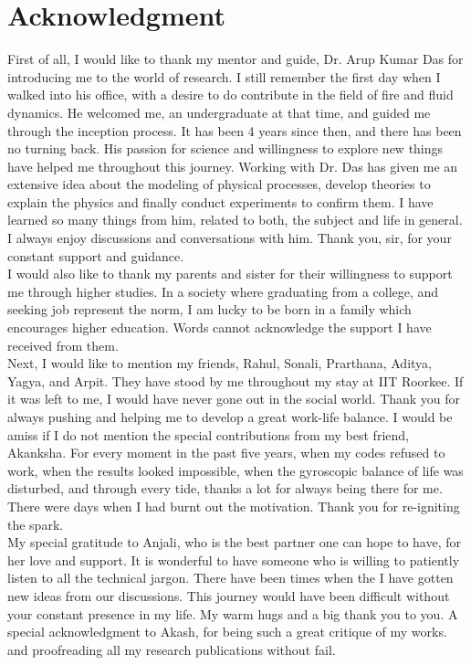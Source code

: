 \chapter*{Acknowledgment}
First of all, I would like to thank my mentor and guide, Dr. Arup Kumar Das for introducing me to the world of research. I still remember the first day when I walked into his office, with a desire to do contribute in the field of fire and fluid dynamics. He welcomed me, an undergraduate at that time, and guided me through the inception process. It has been 4 years since then, and there has been no turning back. His passion for science and willingness to explore new things have helped me throughout this journey. Working with Dr. Das has given me an extensive idea about the modeling of physical processes, develop theories to explain the physics and finally conduct experiments to confirm them. I have learned so many things from him, related to both, the subject and life in general. I always enjoy discussions and conversations with him. Thank you, sir, for your constant support and guidance.\\
I would also like to thank my parents and sister for their willingness to support me through higher studies. In a society where graduating from a college, and seeking job represent the norm, I am lucky to be born in a family which encourages higher education. Words cannot acknowledge the support I have received from them.\\
Next, I would like to mention my friends, Rahul, Sonali, Prarthana, Aditya, Yagya, and Arpit. They have stood by me throughout my stay at IIT Roorkee. If it was left to me, I would have never gone out in the social world. Thank you for always pushing and helping me to develop a great work-life balance. I would be amiss if I do not mention the special contributions from my best friend, Akanksha. For every moment in the past five years, when my codes refused to work, when the results looked impossible, when the gyroscopic balance of life was disturbed, and through every tide, thanks a lot for always being there for me. There were days when I had burnt out the motivation. Thank you for re-igniting the spark.\\
My special gratitude to Anjali, who is the best partner one can hope to have, for her love and support. It is wonderful to have someone who is willing to patiently listen to all the technical jargon. There have been times when the I have gotten new ideas from our discussions. This journey would have been difficult without your constant presence in my life. My warm hugs and a big thank you to you. A special acknowledgment to Akash, for being such a great critique of my works. and proofreading all my research publications without fail.\\
